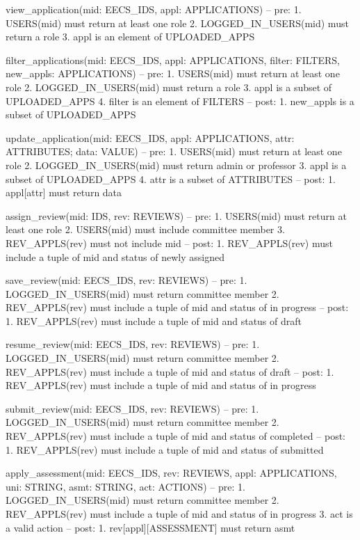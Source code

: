 \documentclass[fontsize=12pt,paper=letter,twoside]{scrartcl}
\begin{document}
\newpage
\begin{code}
view_application(mid: EECS_IDS, appl: APPLICATIONS)
	-- pre: 
		1. USERS(mid) must return at least one role
		2. LOGGED_IN_USERS(mid) must return a role
		3. appl is an element of UPLOADED_APPS

filter_applications(mid: EECS_IDS, appl: APPLICATIONS,
	filter: FILTERS, new_appls: APPLICATIONS)
	-- pre: 
		1. USERS(mid) must return at least one role
		2. LOGGED_IN_USERS(mid) must return a role
		3. appl is a subset of UPLOADED_APPS
		4. filter is an element of FILTERS
	-- post:
		1. new_appls is a subset of UPLOADED_APPS

update_application(mid: EECS_IDS, appl: APPLICATIONS, 
	attr: ATTRIBUTES; data: VALUE)
	-- pre: 
		1. USERS(mid) must return at least one role
		2. LOGGED_IN_USERS(mid) must return admin or
		professor
		3. appl is a subset of UPLOADED_APPS
		4. attr is a subset of ATTRIBUTES
	-- post:
		1. appl[attr] must return data

assign_review(mid: IDS, rev: REVIEWS)
	-- pre: 
		1. USERS(mid) must return at least one role
		2. USERS(mid) must include committee member
		3. REV_APPLS(rev) must not include mid
	-- post:
		1. REV_APPLS(rev) must include a tuple of mid
		and status of newly assigned
\end{code}

\newpage
\begin{code}
save_review(mid: EECS_IDS, rev: REVIEWS)
	-- pre: 
		1. LOGGED_IN_USERS(mid) must return
		committee member
		2. REV_APPLS(rev) must include a tuple of mid
		and status of in progress
	-- post:
		1. REV_APPLS(rev) must include a tuple of mid
		and status of draft

resume_review(mid: EECS_IDS, rev: REVIEWS)
	-- pre: 
		1. LOGGED_IN_USERS(mid) must return
		committee member
		2. REV_APPLS(rev) must include a tuple of mid
		and status of draft
	-- post:
		1. REV_APPLS(rev) must include a tuple of mid
		and status of in progress
		
submit_review(mid: EECS_IDS, rev: REVIEWS)
	-- pre: 
		1. LOGGED_IN_USERS(mid) must return
		committee member
		2. REV_APPLS(rev) must include a tuple of mid
		and status of completed
	-- post:
		1. REV_APPLS(rev) must include a tuple of mid
		and status of submitted
\end{code}

\newpage
\begin{code}
apply_assessment(mid: EECS_IDS, rev: REVIEWS,
	appl: APPLICATIONS, uni: STRING, 
	asmt: STRING, act: ACTIONS)
	-- pre: 
		1. LOGGED_IN_USERS(mid) must return
		committee member
		2. REV_APPLS(rev) must include a tuple of mid
		and status of in progress
		3. act is a valid action
	-- post:
		1. rev[appl][ASSESSMENT] must return asmt
\end{code}
\end{document}
